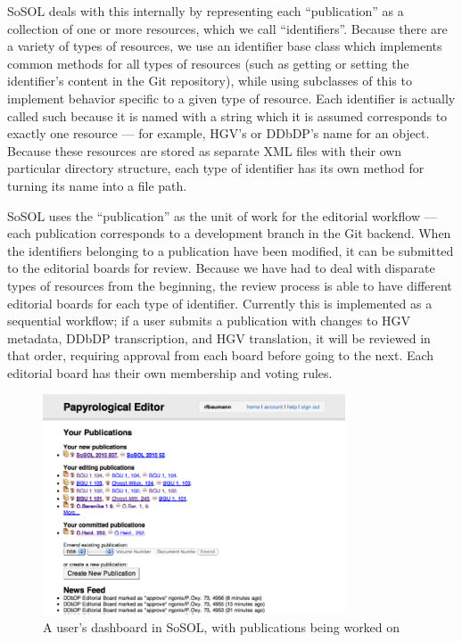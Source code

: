 \documentclass[]{article}
\begin{document}
SoSOL deals with this internally by representing each “publication” as a collection of one or more resources, which we call “identifiers”. Because there are a variety of types of resources, we use an identifier base class which implements common methods for all types of resources (such as getting or setting the identifier's content in the Git repository), while using subclasses of this to implement behavior specific to a given type of resource. Each identifier is actually called such because it is named with a string which it is assumed corresponds to exactly one resource — for example, HGV's or DDbDP's name for an object. Because these resources are stored as separate XML files with their own particular directory structure, each type of identifier has its own method for turning its name into a file path.

SoSOL uses the “publication” as the unit of work for the editorial workflow  — each publication corresponds to a development branch in the Git backend. When the identifiers belonging to a publication have been modified, it can be submitted to the editorial boards for review. Because we have had to deal with disparate types of resources from the beginning, the review process is able to have different editorial boards for each type of identifier. Currently this is implemented as a sequential workflow; if a user submits a publication with changes to HGV metadata, DDbDP transcription, and HGV translation, it will be reviewed in that order, requiring approval from each board before going to the next. Each editorial board has their own membership and voting rules.

\begin{figure}[]
  \centering
  \includegraphics[width=0.8\textwidth]{images/dashboard.png}
  \caption{A user's dashboard in SoSOL, with publications being worked on\label{dashboard}}
\end{figure}
\end{document}
